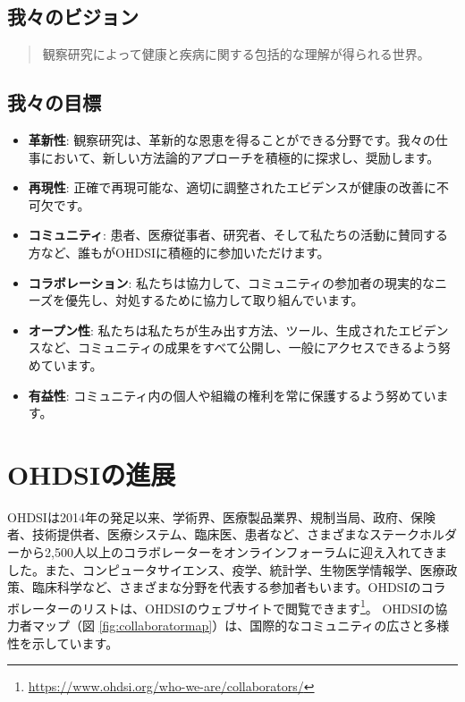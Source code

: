 \documentclass[
  11pt]{book}
\theoremstyle{definition}
\theoremstyle{definition}
\theoremstyle{definition}
\theoremstyle{definition}
\theoremstyle{remark}
\begin{document}
\subsection{我々のビジョン}\label{ux6211ux3005ux306eux30d3ux30b8ux30e7ux30f3}

\begin{quote}
観察研究によって健康と疾病に関する包括的な理解が得られる世界。 
\end{quote}

\subsection{我々の目標}\label{ux6211ux3005ux306eux76eeux6a19}

\begin{itemize}
\item
  \textbf{革新性}: 観察研究は、革新的な恩恵を得ることができる分野です。我々の仕事において、新しい方法論的アプローチを積極的に探求し、奨励します。
\item
  \textbf{再現性}: 正確で再現可能な、適切に調整されたエビデンスが健康の改善に不可欠です。
\item
  \textbf{コミュニティ}: 患者、医療従事者、研究者、そして私たちの活動に賛同する方など、誰もがOHDSIに積極的に参加いただけます。 
\item
  \textbf{コラボレーション}: 私たちは協力して、コミュニティの参加者の現実的なニーズを優先し、対処するために協力して取り組んでいます。
\item
  \textbf{オープン性}: 私たちは私たちが生み出す方法、ツール、生成されたエビデンスなど、コミュニティの成果をすべて公開し、一般にアクセスできるよう努めています。
\item
  \textbf{有益性}: コミュニティ内の個人や組織の権利を常に保護するよう努めています。 
\end{itemize}

\section{OHDSIの進展}\label{ohdsiux306eux9032ux5c55}

OHDSIは2014年の発足以来、学術界、医療製品業界、規制当局、政府、保険者、技術提供者、医療システム、臨床医、患者など、さまざまなステークホルダーから2,500人以上のコラボレーターをオンラインフォーラムに迎え入れてきました。また、コンピュータサイエンス、疫学、統計学、生物医学情報学、医療政策、臨床科学など、さまざまな分野を代表する参加者もいます。OHDSIのコラボレーターのリストは、OHDSIのウェブサイトで閲覧できます\footnote{\url{https://www.ohdsi.org/who-we-are/collaborators/}}。 OHDSIの協力者マップ（図 \ref{fig:collaboratormap}）は、国際的なコミュニティの広さと多様性を示しています。
\end{document}
